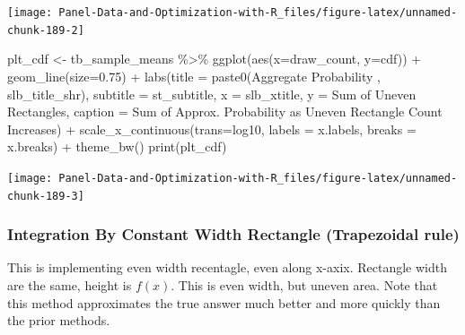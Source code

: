 \documentclass[
]{book}
\newenvironment{Shaded}{\begin{snugshade}}{\end{snugshade}}
\newcommand{\AttributeTok}[1]{\textcolor[rgb]{0.77,0.63,0.00}{#1}}
\newcommand{\FloatTok}[1]{\textcolor[rgb]{0.00,0.00,0.81}{#1}}
\newcommand{\FunctionTok}[1]{\textcolor[rgb]{0.00,0.00,0.00}{#1}}
\newcommand{\NormalTok}[1]{#1}
\newcommand{\OtherTok}[1]{\textcolor[rgb]{0.56,0.35,0.01}{#1}}
\newcommand{\SpecialCharTok}[1]{\textcolor[rgb]{0.00,0.00,0.00}{#1}}
\newcommand{\StringTok}[1]{\textcolor[rgb]{0.31,0.60,0.02}{#1}}
\begin{document}
\begin{center}\texttt{[image: Panel-Data-and-Optimization-with-R\_files/figure-latex/unnamed-chunk-189-2]} \end{center}

\begin{Shaded}
\begin{Highlighting}[]
\NormalTok{plt\_cdf }\OtherTok{\textless{}{-}}\NormalTok{ tb\_sample\_means }\SpecialCharTok{\%\textgreater{}\%}
  \FunctionTok{ggplot}\NormalTok{(}\FunctionTok{aes}\NormalTok{(}\AttributeTok{x=}\NormalTok{draw\_count, }\AttributeTok{y=}\NormalTok{cdf)) }\SpecialCharTok{+}
  \FunctionTok{geom\_line}\NormalTok{(}\AttributeTok{size=}\FloatTok{0.75}\NormalTok{) }\SpecialCharTok{+}
  \FunctionTok{labs}\NormalTok{(}\AttributeTok{title =} \FunctionTok{paste0}\NormalTok{(}\StringTok{\textquotesingle{}Aggregate Probability \textquotesingle{}}\NormalTok{, slb\_title\_shr),}
       \AttributeTok{subtitle =}\NormalTok{ st\_subtitle,}
       \AttributeTok{x =}\NormalTok{ slb\_xtitle,}
       \AttributeTok{y =} \StringTok{\textquotesingle{}Sum of Uneven Rectangles\textquotesingle{}}\NormalTok{,}
       \AttributeTok{caption =} \StringTok{\textquotesingle{}Sum of Approx. Probability as Uneven Rectangle Count Increases\textquotesingle{}}\NormalTok{) }\SpecialCharTok{+}
  \FunctionTok{scale\_x\_continuous}\NormalTok{(}\AttributeTok{trans=}\StringTok{\textquotesingle{}log10\textquotesingle{}}\NormalTok{, }\AttributeTok{labels =}\NormalTok{ x.labels, }\AttributeTok{breaks =}\NormalTok{ x.breaks) }\SpecialCharTok{+}
  \FunctionTok{theme\_bw}\NormalTok{()}
\FunctionTok{print}\NormalTok{(plt\_cdf)}
\end{Highlighting}
\end{Shaded}

\begin{center}\texttt{[image: Panel-Data-and-Optimization-with-R\_files/figure-latex/unnamed-chunk-189-3]} \end{center}

\hypertarget{integration-by-constant-width-rectangle-trapezoidal-rule}{%
\subsubsection{Integration By Constant Width Rectangle (Trapezoidal rule)}\label{integration-by-constant-width-rectangle-trapezoidal-rule}}

This is implementing even width recentagle, even along x-axix. Rectangle width are the same, height is \(f(x)\). This is even width, but uneven area. Note that this method approximates the true answer much better and more quickly than the prior methods.
\end{document}
